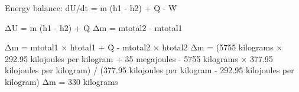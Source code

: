 Energy balance:  
dU/dt = m (h1 - h2) + Q̇ - Ẇ  

ΔU = m (h1 - h2) + Q̇  
Δm = mtotal2 - mtotal1  

Δm = mtotal1 × htotal1 + Q̇ - mtotal2 × htotal2  
Δm = (5755 kilograms × 292.95 kilojoules per kilogram + 35 megajoules - 5755 kilograms × 377.95 kilojoules per kilogram) / (377.95 kilojoules per kilogram - 292.95 kilojoules per kilogram)  
Δm = 330 kilograms
